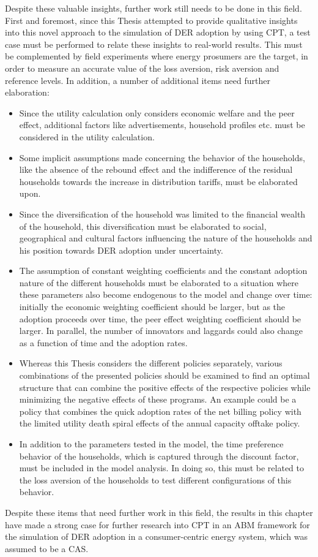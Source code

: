 Despite these valuable insights, further work still needs to be done in this field. First and foremost, since this Thesis attempted to provide qualitative insights into this novel approach to the simulation of DER adoption by using CPT, a test case must be performed to relate these insights to real-world results. This must be complemented by field experiments where energy prosumers are the target, in order to measure an accurate value of the loss aversion, risk aversion and reference levels. In addition, a number of additional items need further elaboration:
\begin{itemize}
\item Since the utility calculation only considers economic welfare and the peer effect, additional factors like advertisements, household profiles etc. must be considered in the utility calculation.
\item Some implicit assumptions made concerning the behavior of the households, like the absence of the rebound effect and the indifference of the residual households towards the increase in distribution tariffs, must be elaborated upon.
\item Since the diversification of the household was limited to the financial wealth of the household, this diversification must be elaborated to social, geographical and cultural factors influencing the nature of the households and his position towards DER adoption under uncertainty.
\item The assumption of constant weighting coefficients and the constant adoption nature of the different households must be elaborated to a situation where these parameters also become endogenous to the model and change over time: initially the economic weighting coefficient should be larger, but as the adoption proceeds over time, the peer effect weighting coefficient should be larger. In parallel, the number of innovators and laggards could also change as a function of time and the adoption rates.
\item Whereas this Thesis considers the different policies separately, various combinations of the presented policies should be examined to find an optimal structure that can combine the positive effects of the respective policies while minimizing the negative effects of these programs. An example could be a policy that combines the quick adoption rates of the net billing policy with the limited utility death spiral effects of the annual capacity offtake policy. 
\item In addition to the parameters tested in the model, the time preference behavior of the households, which is captured through the discount factor, must be included in the model analysis. In doing so, this must be related to the loss aversion of the households to test different configurations of this behavior. 
\end{itemize}
Despite these items that need further work in this field, the results in this chapter have made a strong case for further research into CPT in an ABM framework for the simulation of DER adoption in a consumer-centric energy system, which was assumed to be a CAS. 
